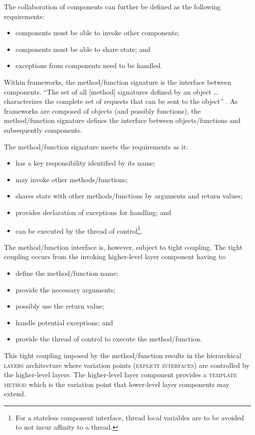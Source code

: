 \documentclass[prodmode]{style/acmlarge}
\begin{document}
The collaboration of components can further be defined as the following
requirements:
\begin{itemize}
  \item components must be able to invoke other components;
  \item components must be able to share state; and
  \item exceptions from components need to be handled.
\end{itemize}

Within frameworks, the method/function signature is the interface between
components.  ``The set of all [method] signatures defined by an object \ldots
characterizes the complete set of requests that can be sent to the object''
\cite[p. 13]{gof}.  As frameworks are composed of objects (and possibly
functions), the method/function signature defines the interface between
objects/functions and subsequently components.

The method/function signature meets the requirements as it:
\begin{itemize}
  \item has a key responsibility identified by its name;
  \item may invoke other methods/functions;
  \item shares state with other methods/functions by arguments and return values;
  \item provides declaration of exceptions for handling; and
  \item can be executed by the thread of control\footnote{For a stateless component interface, thread local variables are to be avoided to not incur affinity to a thread.}.
\end{itemize}

The method/function interface is, however, subject to tight coupling.  The tight
coupling occurs from the invoking higher-level layer component having to:
\begin{itemize}
  \item define the method/function name;
  \item provide the necessary arguments;
  \item possibly use the return value;
  \item handle potential exceptions; and
  \item provide the thread of control to execute the method/function.
\end{itemize}

This tight coupling imposed by the method/function results in the hierarchical
\textsc{layers} architecture where variation points (\textsc{explicit
interfaces}) are controlled by the higher-level layers.  The higher-level layer
component provides a \textsc{template method} \cite{gof} which is the variation
point that lower-level layer components may extend.
\end{document}
